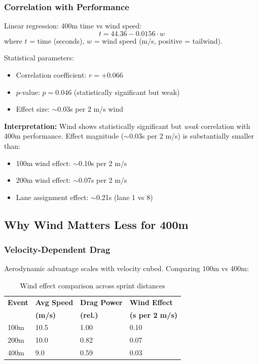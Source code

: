 \subsubsection{Correlation with Performance}

Linear regression: 400m time vs wind speed:
\begin{equation}
t = 44.36 - 0.0156 \cdot w
\end{equation}
where $t$ = time (seconds), $w$ = wind speed (m/s, positive = tailwind).

Statistical parameters:
\begin{itemize}
    \item Correlation coefficient: $r = +0.066$
    \item $p$-value: $p = 0.046$ (statistically significant but weak)
    \item Effect size: $\sim$0.03s per 2 m/s wind
\end{itemize}

\textbf{Interpretation:} Wind shows statistically significant but \textit{weak} correlation with 400m performance. Effect magnitude ($\sim$0.03s per 2 m/s) is substantially smaller than:
\begin{itemize}
    \item 100m wind effect: $\sim$0.10s per 2 m/s \citep{Linthorne2004}
    \item 200m wind effect: $\sim$0.07s per 2 m/s \citep{Quinn2009}
    \item Lane assignment effect: $\sim$0.21s (lane 1 vs 8)
\end{itemize}

\subsection{Why Wind Matters Less for 400m}

\subsubsection{Velocity-Dependent Drag}

Aerodynamic advantage scales with velocity cubed. Comparing 100m vs 400m:

\begin{table}[H]
\centering
\caption{Wind effect comparison across sprint distances}
\begin{tabular}{@{}llll@{}}
\toprule
\textbf{Event} & \textbf{Avg Speed} & \textbf{Drag Power} & \textbf{Wind Effect} \\
 & \textbf{(m/s)} & \textbf{(rel.)} & \textbf{(s per 2 m/s)} \\
\midrule
100m & 10.5 & 1.00 & 0.10 \\
200m & 10.0 & 0.82 & 0.07 \\
400m & 9.0 & 0.59 & 0.03 \\
\bottomrule
\end{tabular}
\end{table}


